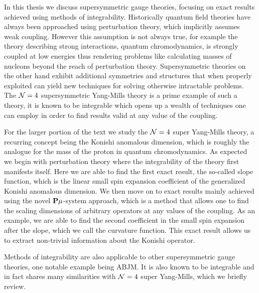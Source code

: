 In this thesis we discuss supersymmetric gauge theories, focusing on exact results achieved using methods of integrability. 
Historically quantum field theories have always been approached using perturbation theory, which implicitly assumes weak coupling.
However this assumption is not always true, for example the theory describing strong interactions, quantum chromodynamics, is strongly coupled at low energies thus rendering problems like calculating masses of nucleons beyond the reach of perturbation theory.
Supersymmetric theories on the other hand exhibit additional symmetries and structures that when properly exploited can yield new techniques for solving otherwise intractable problems.
The $\mathcal{N}=4$ supersymmetric Yang-Mills theory is a prime example of such a theory, it is known to be integrable which opens up a wealth of techniques one can employ in order to find results valid at any value of the coupling. 

For the larger portion of the text we study the $\mathcal{N}=4$ super Yang-Mills theory, a recurring concept being the Konishi anomalous dimension, which is roughly the analogue for the mass of the proton in quantum chromodynamics.
As expected we begin with perturbation theory where the integrability of the theory first manifests itself.
Here we are able to find the first exact result, the so-called slope function, which is the linear small spin expansion coefficient of the generalized Konishi anomalous dimension.
We then move on to exact results mainly achieved using the novel ${\bf P}\mu$-system approach, which is a method that allows one to find the scaling dimensions of arbitrary operators at any values of the coupling.
As an example, we are able to find the second coefficient in the small spin expansion after the slope, which we call the curvature function.
This exact result allows us to extract non-trivial information about the Konishi operator.

Methods of integrability are also applicable to other supersymmetric gauge theories, one notable example being ABJM.
It is also known to be integrable and in fact shares many similarities with $\mathcal{N}=4$ super Yang-Mills, which we briefly review.
